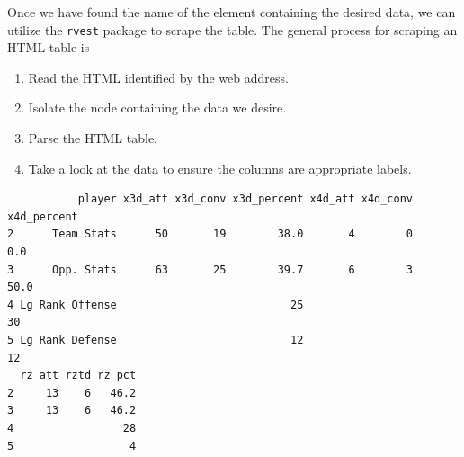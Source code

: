 \documentclass[
]{article}
\newenvironment{Shaded}{\begin{snugshade}}{\end{snugshade}}
\newcommand{\CommentTok}[1]{\textcolor[rgb]{0.56,0.35,0.01}{\textit{#1}}}
\newcommand{\DataTypeTok}[1]{\textcolor[rgb]{0.13,0.29,0.53}{#1}}
\newcommand{\DecValTok}[1]{\textcolor[rgb]{0.00,0.00,0.81}{#1}}
\newcommand{\KeywordTok}[1]{\textcolor[rgb]{0.13,0.29,0.53}{\textbf{#1}}}
\newcommand{\NormalTok}[1]{#1}
\newcommand{\OperatorTok}[1]{\textcolor[rgb]{0.81,0.36,0.00}{\textbf{#1}}}
\newcommand{\StringTok}[1]{\textcolor[rgb]{0.31,0.60,0.02}{#1}}
\providecommand{\tightlist}{%
  \setlength{\itemsep}{0pt}\setlength{\parskip}{0pt}}
\begin{document}
Once we have found the name of the element containing the desired data, we can utilize the \texttt{rvest} package to scrape the table. The general process for scraping an HTML table is

\begin{enumerate}
\def\labelenumi{\arabic{enumi}.}
\tightlist
\item
  Read the HTML identified by the web address.
\item
  Isolate the node containing the data we desire.
\item
  Parse the HTML table.
\item
  Take a look at the data to ensure the columns are appropriate labels.
\end{enumerate}

\begin{Shaded}
\end{Shaded}

\begin{verbatim}
           player x3d_att x3d_conv x3d_percent x4d_att x4d_conv x4d_percent
2      Team Stats      50       19        38.0       4        0         0.0
3      Opp. Stats      63       25        39.7       6        3        50.0
4 Lg Rank Offense                           25                           30
5 Lg Rank Defense                           12                           12
  rz_att rztd rz_pct
2     13    6   46.2
3     13    6   46.2
4                 28
5                  4
\end{verbatim}
\end{document}
